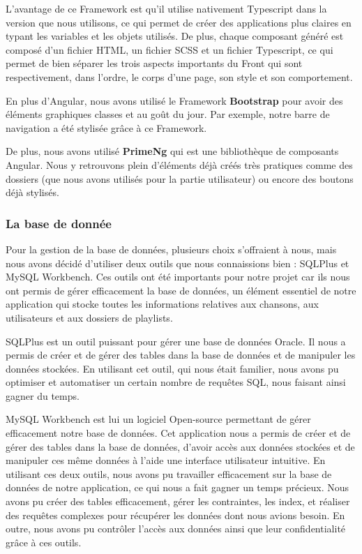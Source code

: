 \documentclass[12pt,french]{article}
\begin{document}
\medskip

L'avantage de ce \gls{Framework} est qu'il utilise nativement \gls{Typescript} dans la version que nous utilisons, ce qui permet de créer des applications plus claires en typant les variables et les objets utilisés. De plus, chaque composant généré est composé d'un fichier \gls{HTML}, un fichier \gls{SCSS} et un fichier \gls{Typescript}, ce qui permet de bien séparer les trois aspects importants du \gls{Front} qui sont respectivement, dans l'ordre, le corps d'une page, son style et son comportement.

\bigskip

En plus d'Angular, nous avons utilisé le \gls{Framework} \textbf{Bootstrap} pour avoir des éléments graphiques classes et au goût du jour. Par exemple, notre barre de navigation a été stylisée grâce à ce \gls{Framework}.

De plus, nous avons utilisé \textbf{PrimeNg} qui est une bibliothèque de composants Angular. Nous y retrouvons plein d'éléments déjà créés très pratiques comme des dossiers (que nous avons utilisés pour la partie utilisateur) ou encore des boutons déjà stylisés.

\subsubsection{La base de donnée}

Pour la gestion de la base de données, plusieurs choix s'offraient à nous, mais nous avons décidé d'utiliser deux outils que nous connaissions bien : SQLPlus et MySQL Workbench. Ces outils ont été importants pour notre projet car ils nous ont permis de gérer efficacement la base de données, un élément essentiel de notre application qui stocke toutes les informations relatives aux chansons, aux utilisateurs et aux dossiers de playlists.
\newline

SQLPlus est un outil puissant pour gérer une base de données Oracle. Il nous a permis de créer et de gérer des tables dans la base de données et de manipuler les données stockées. En utilisant cet outil, qui nous était familier, nous avons pu optimiser et automatiser un certain nombre de requêtes \gls{SQL}, nous faisant ainsi gagner du temps.
\newline

MySQL Workbench est lui un logiciel \gls{Open-source} permettant de gérer efficacement notre base de données. Cet application nous a permis de créer et de gérer des tables dans la base de données, d'avoir accès aux données stockées et de manipuler ces même données à l'aide une interface utilisateur intuitive.
\newline
En utilisant ces deux outils, nous avons pu travailler efficacement sur la base de données de notre application, ce qui nous a fait gagner un temps précieux. Nous avons pu créer des tables efficacement, gérer les contraintes, les index, et réaliser des requêtes complexes pour récupérer les données dont nous avions besoin. En outre, nous avons pu contrôler l'accès aux données ainsi que leur confidentialité grâce à ces outils.
\end{document}
